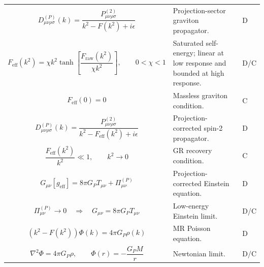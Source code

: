 \documentclass[11pt]{article}
\newcommand{\eff}{\mathrm{eff}}
\newcommand{\raw}{\mathrm{raw}}
\begin{document}
\begin{longtable}{>{\raggedright\arraybackslash}p{} >{\raggedright\arraybackslash}p{} >{\centering\arraybackslash}p{}}
\begin{equation}
D^{(P)}_{\mu\nu\rho\sigma}(k)
=
\frac{
P^{(2)}_{\mu\nu\rho\sigma}
}{
k^2 - F(k^2) + i\epsilon
}
\end{equation}
& Projection-sector graviton propagator. & D \\

\begin{equation}
F_{\eff}(k^2)=\chi k^2\tanh\left[\frac{F_{\raw}(k^2)}{\chi k^2}\right],\qquad 0<\chi<1
\end{equation}
& Saturated self-energy; linear at low response and bounded at high response. & D/C \\

\begin{equation}
F_{\eff}(0)=0
\end{equation}
& Massless graviton condition. & C \\

\begin{equation}
D_{\mu\nu\rho\sigma}^{(P)}(k)=\frac{P^{(2)}_{\mu\nu\rho\sigma}}{k^2-F_{\eff}(k^2)+i\epsilon}
\end{equation}
& Projection-corrected spin-2 propagator. & D \\

\begin{equation}
\frac{F_{\eff}(k^2)}{k^2}\ll1,\qquad k^2\rightarrow0
\end{equation}
& GR recovery condition. & C \\

\begin{equation}
G_{\mu\nu}[g_{\eff}]=8\pi G_P T_{\mu\nu}+\Pi_{\mu\nu}^{(P)}
\end{equation}
& Projection-corrected Einstein equation. & D \\

\begin{equation}
\Pi_{\mu\nu}^{(P)}\rightarrow0\quad\Rightarrow\quad G_{\mu\nu}=8\pi G_PT_{\mu\nu}
\end{equation}
& Low-energy Einstein limit. & D/C \\

\begin{equation}
(k^2-F(k^2))\Phi(k)=4\pi G_P\rho(k)
\end{equation}
& MR Poisson equation. & D \\

\begin{equation}
\nabla^2\Phi=4\pi G_P\rho,
\qquad
\Phi(r)=-\frac{G_PM}{r}
\end{equation}
& Newtonian limit. & D/C \\

\bottomrule
\end{longtable}
\end{document}
